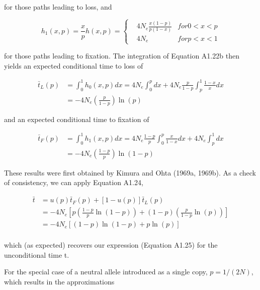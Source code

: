\documentclass{article}
\begin{document}
for those paths leading to loss, and

\begin{equation}
h_{1}(x,p)=\frac{x}{p}h(x,p)=\left\{\begin{aligned}&4N_{e}\frac{x(1-p)}{p(1-x)}&for0<x<p\\ &4N_{e}&for p<x<1\end{aligned}\right.
\end{equation}

for those paths leading to fixation. The integration of Equation A1.22b then yields an expected conditional time to loss of

\begin{equation}
\begin{aligned}\bar{t}_{L}(p)&=\int_{0}^{1}h_{0}(x,p)dx=4N_{e}\int_{0}^{p}dx+4N_{e}\frac{p}{1-p}\int_{p}^{1}\frac{1-x}{x}dx\\&=-4N_{e}\left(\frac{p}{1-p}\right)\ln(p)\end{aligned}
\end{equation}

and an expected conditional time to fixation of

\begin{equation}
\begin{aligned}\bar{t}_{F}(p)&=\int_{0}^{1}h_{1}(x,p)dx=4N_{e}\frac{1-p}{p}\int_{0}^{p}\frac{x}{1-x}dx+4N_{e}\int_{p}^{1}dx\\&=-4N_{e}\left(\frac{1-p}{p}\right)\ln(1-p)\end{aligned}
\end{equation}

These results were first obtained by Kimura and Ohta (1969a, 1969b). As a check of consistency, we can apply Equation A1.24,

\begin{equation}
\begin{aligned}\bar{t}&=u(p)\bar{t}_{F}(p)+\left[1-u(p)\right]\bar{t}_{L}(p)\\&=-4N_{e}\left[p\left(\frac{1-p}{p}\ln(1-p)\right)+(1-p)\left(\frac{p}{1-p}\ln(p)\right)\right]\\&=-4N_{e}\left[(1-p)\ln(1-p)+p\ln(p)\right]\\ \end{aligned}
\end{equation}

which (as expected) recovers our expression (Equation A1.25) for the unconditional time t.

For the special case of a neutral allele introduced as a single copy,  $ p = 1/(2N) $, which results in the approximations
\end{document}
